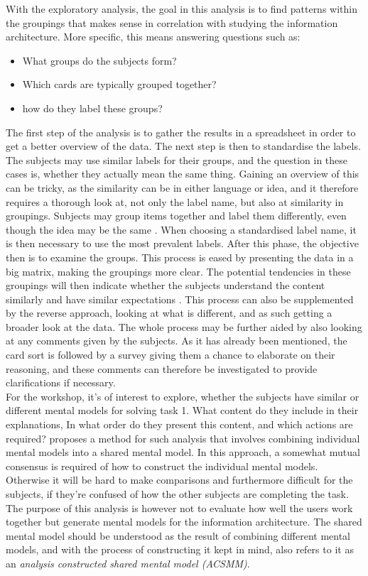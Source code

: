 With the exploratory analysis, the goal in this analysis is to find patterns within the groupings that makes sense in correlation with studying the information architecture. More specific, this means answering questions such as:
%
\begin{itemize}
	\item What groups do the subjects form?
	\item Which cards are typically grouped together?
	\item how do they label these groups?
\end{itemize}
%
\noindent
The first step of the analysis is to gather the results in a spreadsheet in order to get a better overview of the data. The next step is then to standardise the labels. The subjects may use similar labels for their groups, and the question in these cases is, whether they actually mean the same thing. Gaining an overview of this can be tricky, as the similarity can be in either language or idea, and it therefore requires a thorough look at, not only the label name, but also at similarity in groupings. Subjects may group items together and label them differently, even though the idea may be the same \parencite[][184]{WEB:DonnaSpencer}. When choosing a standardised label name, it is then necessary to use the most prevalent labels. After this phase, the objective then is to examine the groups. This process is eased by presenting the data in a big matrix, making the groupings more clear. The potential tendencies in these groupings will then indicate whether the subjects understand the content similarly and have similar expectations \parencite[][191]{WEB:DonnaSpencer}. This process can also be supplemented by the reverse approach, looking at what is different, and as such getting a broader look at the data. The whole process may be further aided by also looking at any comments given by the subjects. As it has already been mentioned, the card sort is followed by a survey giving them a chance to elaborate on their reasoning, and these comments can therefore be investigated to provide clarifications if necessary. \\

\noindent
For the workshop, it's of interest to explore, whether the subjects have similar or different mental models for solving task 1. What content do they include in their explanations, In what order do they present this content, and which actions are required? \textcite{WEB:ConceptMapAnalysis} proposes a method for such analysis that involves combining individual mental models into a shared mental model. In this approach, a somewhat mutual consensus is required of how to construct the individual mental models. Otherwise it will be hard to make comparisons and furthermore difficult for the subjects, if they're confused of how the other subjects are completing the task. The purpose of this analysis is however not to evaluate how well the users work together but generate mental models for the information architecture. The shared mental model should be understood as the result of combining different mental models, and with the process of constructing it kept in mind, \textcite{WEB:ConceptMapAnalysis} also refers to it as an \textit{analysis constructed shared mental model (ACSMM)}.

